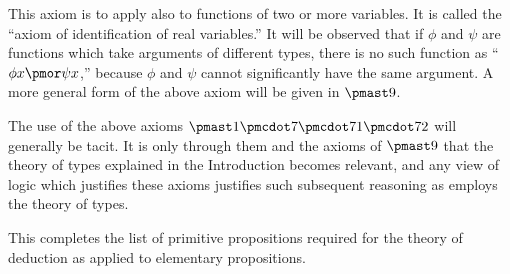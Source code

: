 This axiom is to apply also to functions of two or more variables. It is called the ``axiom of identification of real variables.'' It will be observed that if $\phi$ and $\psi$ are functions which take arguments of different types, there is no such function as ``$\phi x \pmor \psi x$,'' because $\phi$ and $\psi$ cannot significantly have the same argument. A more general form of the above axiom will be given in $\pmast9$.

The use of the above axioms \(\pmast1\pmcdot7\pmcdot71\pmcdot72\) will generally be tacit. It is only through them and the axioms of $\pmast9$ that the theory of types explained in the Introduction becomes relevant, and any view of logic which justifies these axioms justifies such subsequent reasoning as employs the theory of types.

This completes the list of primitive propositions required for the theory of deduction as applied to elementary propositions.